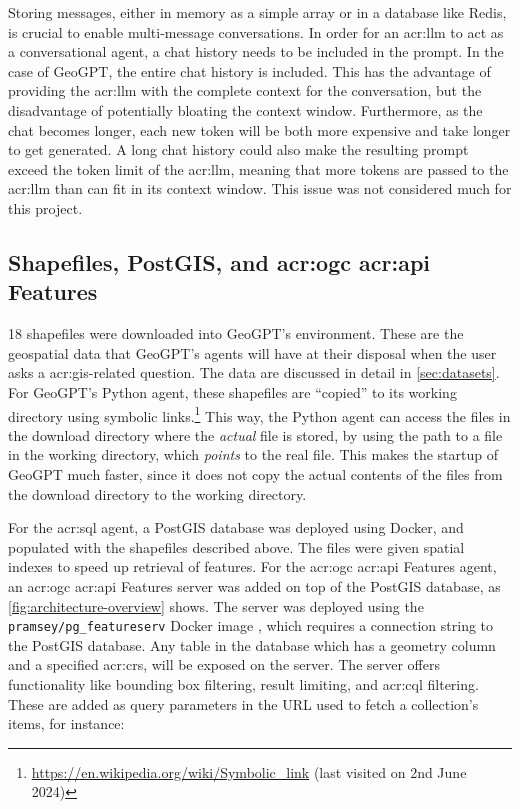 Storing messages, either in memory as a simple array or in a database like Redis, is crucial to enable multi-message conversations. In order for an \gls{acr:llm} to act as a conversational agent, a chat history needs to be included in the prompt. In the case of GeoGPT, the entire chat history is included. This has the advantage of providing the \gls{acr:llm} with the complete context for the conversation, but the disadvantage of potentially bloating the context window. Furthermore, as the chat becomes longer, each new token will be both more expensive and take longer to get generated. A long chat history could also make the resulting prompt exceed the token limit of the \gls{acr:llm}, meaning that more tokens are passed to the \acrshort{acr:llm} than can fit in its context window. This issue was not considered much for this project.

\subsection[Shapefiles, PostGIS, and OGC API Features]{Shapefiles, PostGIS, and \acrshort{acr:ogc} \acrshort{acr:api} Features}
\label{subsec:postgis-and-oaf-architecture}

18 shapefiles were downloaded into GeoGPT's environment. These are the geospatial data that GeoGPT's agents will have at their disposal when the user asks a \acrshort{acr:gis}-related question. The data are discussed in detail in \autoref{sec:datasets}. For GeoGPT's Python agent, these shapefiles are \enquote{copied} to its working directory using symbolic links.\footnote{\url{https://en.wikipedia.org/wiki/Symbolic_link} (last visited on 2nd June 2024)} This way, the Python agent can access the files in the download directory where the \textit{actual} file is stored, by using the path to a file in the working directory, which \textit{points} to the real file. This makes the startup of GeoGPT much faster, since it does not copy the actual contents of the files from the download directory to the working directory.

For the \acrshort{acr:sql} agent, a PostGIS database was deployed using Docker, and populated with the shapefiles described above. The files were given spatial indexes to speed up retrieval of features. For the \acrshort{acr:ogc} \acrshort{acr:api} Features agent,  an \acrshort{acr:ogc} \acrshort{acr:api} Features server was added on top of the PostGIS database, as \autoref{fig:architecture-overview} shows. The server was deployed using the \texttt{pramsey/pg\_featureserv} Docker image \citep{crunchydataCrunchyDataPg_featureserv2024}, which requires a connection string to the PostGIS database. Any table in the database which has a geometry column and a specified \gls{acr:crs}, will be exposed on the server. The server offers functionality like bounding box filtering, result limiting, and \acrshort{acr:cql} filtering. These are added as query parameters in the URL used to fetch a collection's items, for instance:

